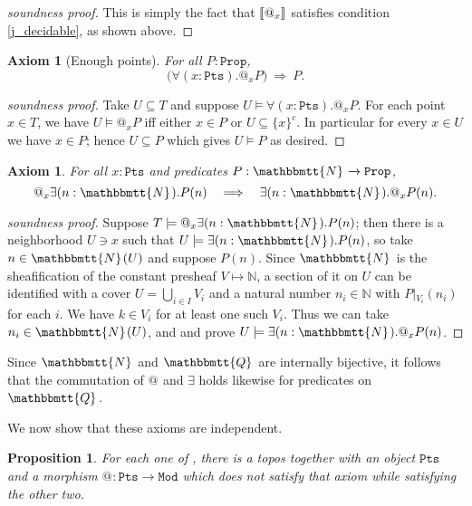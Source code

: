 \documentclass[reqno,11pt]{amsproc}
\makeatletter
\theoremstyle{plain}
\newtheorem{proposition}[theorem]{Proposition}
\newtheorem{axiom}[theorem]{Axiom}\crefname{axiom}{Axiom}{Axioms}
\theoremstyle{definition}
\newenvironment{soundproof}{\begin{proof}[soundness proof]}{\end{proof}}
\DeclarePairedDelimiter{\church}{\llbracket}{\rrbracket}
\newcommand{\Const}[1]{\mathtt{#1}}
\renewcommand{\to}[1][]{\xrightarrow{#1}}
\newcommand{\internal}[1]{\raisebox{-.03ex}{$\mathbbmtt{#1}$}}
\newcommand{\nn}{\mathbb{N}}
\newcommand{\hs}{\hspace{1pt}}
\newcommand{\tnn}{\internal{N}\hs}
\newcommand{\tqq}{\internal{Q}\hs}
\newcommand{\prop}{\Const{Prop}}
\newcommand{\pt}{x}
\newcommand{\pts}{\mathtt{Pts}}		%
\newcommand{\modts}{\mathtt{Mod}}		%
\newcommand{\rest}[2]{#1\big|\hspace{0in}_{#2}}
\newcommand{\atsymbol}{{@}}
\newcommand{\at}[1][\pt]{\atsymbol_{#1}}
\numberwithin{equation}{section}
\makeatother
\begin{document}
\begin{soundproof}
	This is simply the fact that $\church{\at}$ satisfies condition \ref{j_decidable}, as shown above.
\end{soundproof}

\begin{axiom}[Enough points]\label{ax.enough_pts}
	For all $P : \prop$,
	\[
		\big( \forall (\pt : \pts). \at P \big) \: \Rightarrow \: P.
	\]
\end{axiom}

\begin{soundproof}
Take $U\subseteq T$ and suppose $U\models\forall (\pt : \pts). \at P$. For each point $\pt\in T$, we have $U\models\at P$ iff either $\pt\in P$ or $U\subseteq\{\pt\}^c$. In particular for every $\pt\in U$ we have $\pt\in P$; hence $U\subseteq P$ which gives $U\models P$ as desired.
\end{soundproof}

\begin{axiom}
	\label{ax.N_flabby}
	For all $\pt : \pts$ and predicates $P : \tnn \to \prop$,
	\[
		\at \exists (n : \tnn) . P(n) \quad \Longrightarrow \quad \exists (n : \tnn) . \at P(n).
	\]
\end{axiom}

\begin{soundproof}
Suppose $T\models\at \exists (n : \tnn) . P(n)$; then there is a neighborhood $U\ni\pt$ such that $U\models\exists (n : \tnn) . P(n)$, so take $n\in\tnn(U)$ and suppose $P(n)$. Since $\tnn$ is the sheafification of the constant presheaf $V\mapsto\nn$, a section of it on $U$ can be identified with a cover $U=\bigcup_{i\in I}V_i$ and a natural number $n_i\in\nn$ with $\rest{P}{V_i}(n_i)$ for each $i$. We have $k\in V_i$ for at least one such $V_i$. Thus we can take $n_i\in\tnn(U)$, and and prove $U\models\exists(n:\tnn).\at P(n)$.
\end{soundproof}

Since $\tnn$ and $\tqq$ are internally bijective, it follows that the commutation of $\at[]$ and $\exists$ holds likewise for predicates on $\tqq$.

We now show that these axioms are independent.

\begin{proposition}
	For each one of , there is a topos together with an object $\pts$ and a morphism $\at[] \colon \pts \to \modts$ which does not satisfy that axiom while satisfying the other two.
\end{proposition}
\end{document}
